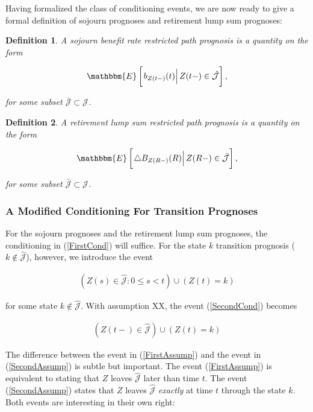 \documentclass{book}
\newcommand{\1}[1]{\mathbbm{1}_{\left\lbrace #1 \right\rbrace}}
\newcommand{\econd}[2][def]{\mathbbm{E} \left[ \left. #1 \right| #2 \right]}
\theoremstyle{break}
\newtheorem{definition}{Definition}%
\theoremstyle{remark}
\numberwithin{equation}{section}
\begin{document}
Having formalized the class of conditioning events, we are now ready to give a formal definition of sojourn prognoses and retirement lump sum prognoses:

\begin{definition}
	A sojourn benefit rate restricted path prognosis is a quantity on the form
	
	\begin{gather*}
		\econd[b_{Z(t-)}(t)]{Z(t-) \in \hat{\mathcal{J}}},
	\end{gather*}
	
	for some subset $\bar{\mathcal{J}} \subset \mathcal{J}$.
\end{definition}

\begin{definition}
	A retirement lump sum restricted path prognosis is a quantity on the form
	
	\begin{gather*}
		\econd[\triangle B_{Z(R-)}(R)]{Z(R-) \in \bar{\mathcal{J}}},
	\end{gather*}
	
	for some subset $\bar{\mathcal{J}} \subset \mathcal{J}$.
\end{definition}

\subsubsection{A Modified Conditioning For Transition Prognoses}

For the sojourn prognoses and the retirement lump sum prognoses, the conditioning in (\ref{FirstCond}) will suffice. For the state $k$ transition prognosis ($k \notin \hat{\mathcal{J}}$), however, we introduce the event

\begin{align} \label{SecondCond}
	\left( Z(s) \in \hat{\mathcal{J}} : 0 \leq s < t\right) \cup \left(Z(t) = k \right)
\end{align}

for some state $k \notin \hat{\mathcal{J}}$. With assumption XX, the event (\ref{SecondCond}) becomes

\begin{align} \label{SecondAssump}
	\left( Z(t-) \in \hat{\mathcal{J}}\right) \cup \left(Z(t) = k \right)
\end{align}

The difference between the event in (\ref{FirstAssump}) and the event in (\ref{SecondAssump}) is subtle but important. The event (\ref{FirstAssump}) is equivalent to stating that $Z$ leaves $ \hat{\mathcal{J}}$ later than time $t$. The event (\ref{SecondAssump}) states that $Z$ leaves $\hat{\mathcal{J}}$ \textit{exactly} at time $t$ through the state $k$. Both events are interesting in their own right:
\end{document}
